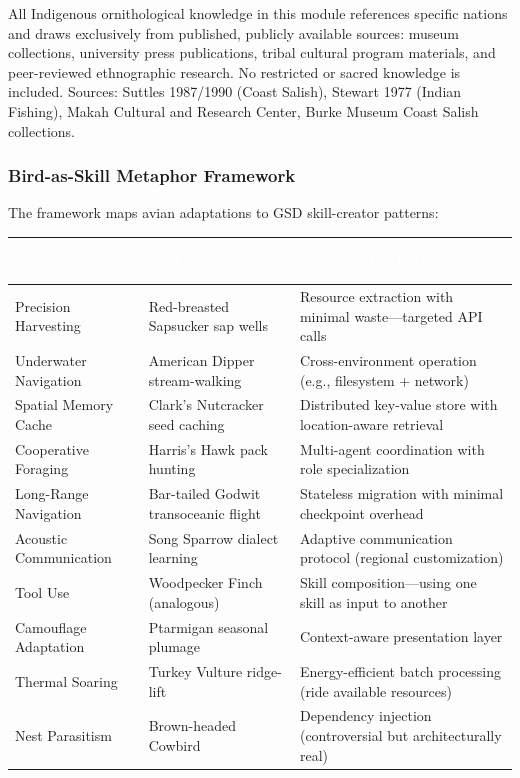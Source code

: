 \documentclass[11pt,letterpaper]{article}
\newcommand{\tableheader}[1]{\textbf{\sffamily\textcolor{white}{#1}}}
\begin{document}
All Indigenous ornithological knowledge in this module references specific nations and draws exclusively from published, publicly available sources: museum collections, university press publications, tribal cultural program materials, and peer-reviewed ethnographic research. No restricted or sacred knowledge is included. Sources: Suttles 1987/1990 (Coast Salish), Stewart 1977 (Indian Fishing), Makah Cultural and Research Center, Burke Museum Coast Salish collections.

\subsubsection{Bird-as-Skill Metaphor Framework}
The framework maps avian adaptations to GSD skill-creator patterns:

\begin{center}
\begin{tabularx}{\textwidth}{L{3cm}L{3.5cm}X}
\toprule
{}
\tableheader{Avian Adaptation} & \tableheader{Bird Example} & \tableheader{Skill-Creator Pattern} \\
\midrule
Precision Harvesting & Red-breasted Sapsucker sap wells & Resource extraction with minimal waste---targeted API calls \\
Underwater Navigation & American Dipper stream-walking & Cross-environment operation (e.g., filesystem + network) \\
Spatial Memory Cache & Clark's Nutcracker seed caching & Distributed key-value store with location-aware retrieval \\
Cooperative Foraging & Harris's Hawk pack hunting & Multi-agent coordination with role specialization \\
Long-Range Navigation & Bar-tailed Godwit transoceanic flight & Stateless migration with minimal checkpoint overhead \\
Acoustic Communication & Song Sparrow dialect learning & Adaptive communication protocol (regional customization) \\
Tool Use & Woodpecker Finch (analogous) & Skill composition---using one skill as input to another \\
Camouflage Adaptation & Ptarmigan seasonal plumage & Context-aware presentation layer \\
Thermal Soaring & Turkey Vulture ridge-lift & Energy-efficient batch processing (ride available resources) \\
Nest Parasitism & Brown-headed Cowbird & Dependency injection (controversial but architecturally real) \\
\bottomrule
\end{tabularx}
\end{center}
\end{document}
